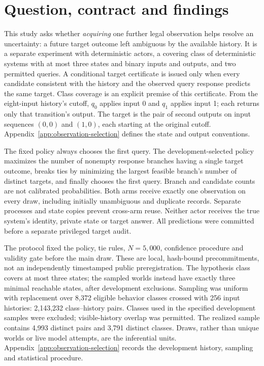 \section{Question, contract and findings}
\label{observation-selection}

This study asks whether
\emph{acquiring} one further legal observation helps resolve an
uncertainty: a future target outcome left ambiguous by the available
history. It is a separate experiment with deterministic actors, a
covering class of deterministic systems with at most three states and
binary inputs and outputs, and two permitted queries. A conditional
target certificate is issued only when every candidate consistent with
the history and the observed query response predicts the same target.
Class coverage is an explicit premise of this certificate. From the
eight-input history's cutoff, $q_0$ applies input 0 and $q_1$ applies
input 1; each returns only that transition's output. The target is the
pair of second outputs on input sequences $(0,0)$ and $(1,0)$, each
starting at the original cutoff. Appendix~\ref{app:observation-selection}
defines the state and output conventions.

The fixed policy always chooses the first query. The development-selected
policy maximizes the number of nonempty response branches having a
single target outcome, breaks ties by minimizing the largest feasible
branch's number of distinct targets, and finally chooses the first
query. Branch and candidate counts are not calibrated probabilities.
Both arms receive exactly one observation on every draw, including
initially unambiguous and duplicate records. Separate processes and
state copies prevent cross-arm reuse. Neither actor receives the true
system's identity, private state or target answer. All predictions were
committed before a separate privileged target audit.

The protocol fixed the policy, tie rules, $N=5{,}000$, confidence
procedure and validity gate before the main draw. These are local, hash-bound
precommitments, not an independently timestamped public preregistration.
The hypothesis class covers at most three states; the sampled worlds instead
have exactly three minimal reachable states, after development exclusions.
Sampling was uniform
with replacement over 8,372 eligible behavior classes crossed with
256 input histories: 2,143,232 class--history pairs. Classes used in the
specified development samples were excluded; visible-history overlap
was permitted. The realized sample contains 4,993 distinct pairs and
3,791 distinct classes. Draws, rather than unique worlds or live model
attempts, are the inferential units. Appendix~\ref{app:observation-selection}
records the development history, sampling and statistical procedure.

